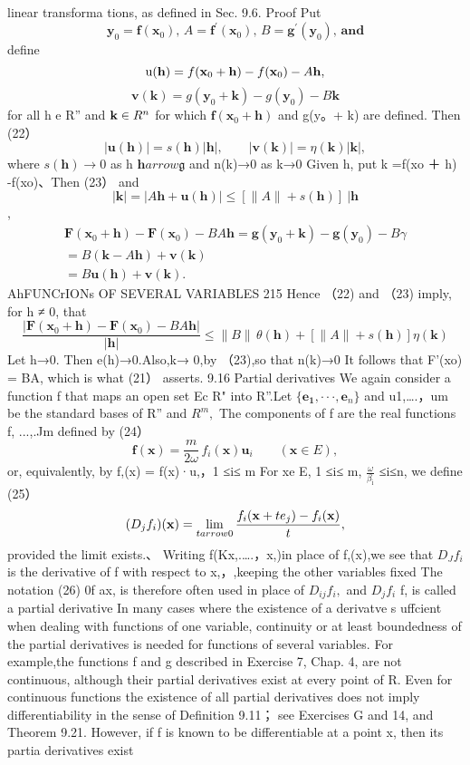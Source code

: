 linear transforma tions, as defined in Sec. 9.6. Proof Put $$ \mathbf{y}_{0}=\mathbf{f}(\mathbf{x}_{0}),\,A={\mathbf{f}}^{\prime}(\mathbf{x}_{0}),\,B=\mathbf{g}^{\prime}(\mathbf{y}_{0}),\,\mathbf{and} $$ define $$ \mathrm{u}({\bf h})=f({\bf x}_{0}+{\bf h})-f({\bf x}_{0})-A{\bf h}, $$ $$ \mathbf{v}(\mathbf{k})=g(\mathbf{y}_{0}+\mathbf{k})-g(\mathbf{y}_{0})-B\mathbf{k} $$ for all h e R” and ${\bf k}\in R^{n}$ for which $\mathbf{f}(\mathbf{x}_{\mathrm{0}}+\mathbf{h})$ and g(y。+ k) are defined. Then (22） $$ \left|\mathbf{u}(\mathbf{h})\right|=s(\mathbf{h})\left|\mathbf{h}\right|,\qquad\left|\mathbf{v}(\mathbf{k})\right|=\eta(\mathbf{k})\left|\mathbf{k}\right|, $$ where $s(\mathbf{h})\to0$ as h ${\mathbf{h}} arrow{\mathfrak{g}}$ and n(k)→0 as k→0 Given h, put k =f(xo ＋ h) -f(xo)、Then (23） and $$ |\mathbf{k}|=|A\mathbf{h}+\mathbf{u}(\mathbf{h})|\leq[\|A\|+s(\mathbf{h})]\mathbf{~}|\mathbf{h} $$ , $$ \begin{array}{r}{\mathbf{F}(\mathbf{x}_{0}+\mathbf{h})-\mathbf{F}(\mathbf{x}_{0})-B A\mathbf{h}=\mathbf{g}(\mathbf{y}_{0}+\mathbf{k})-\mathbf{g}(\mathbf{y}_{0})-B\gamma}\\ {=B(\mathbf{k}-A\mathbf{h})+\mathbf{v}(\mathbf{k})}\\ {=B\mathbf{u}(\mathbf{h})+\mathbf{v}(\mathbf{k}).}\end{array} $$ AhFUNCrIONs OF SEVERAL VARIABLES 215 Hence （22) and （23) imply, for h ≠ 0, that $$ {\frac{|\mathbf{F}(\mathbf{x}_{0}+\mathbf{h})-\mathbf{F}(\mathbf{x}_{0})-B A\mathbf{h}|}{|\mathbf{h}|}}\leq\|B\|\,\theta(\mathbf{h})+[\|A\|+s(\mathbf{h})]\eta(\mathbf{k}) $$ Let h→0. Then e(h)→0.Also,k→ 0,by （23),so that n(k)→0 It follows that F’(xo) = BA, which is what (21） asserts. 9.16 Partial derivatives We again consider a function f that maps an open set Ec R" into R”.Let $\{\mathbf{e_{1}},\cdot\cdot\cdot,\mathbf{e}_{n}\}$ and {u1,….，um} be the standard bases of R” and $R^{m},$ The components of f are the real functions f, ...,.Jm defined by (24） $$ \mathbf{f}(\mathbf{x})={\frac{m}{2\omega}}\,f_{i}(\mathbf{x})\mathbf{u}_{i}\qquad(\mathbf{x}\in E), $$ or, equivalently, by f,(x) = f(x)·u,，1 ≤i≤ m For xe E, 1 ≤i≤ m, $\textstyle{\frac{\omega}{\beta_{\mathrm{i}}}}$ ≤i≤n, we define (25） $$ (D_{j}f_{i})({\bf x})=\operatorname*{lim}_{t arrow0}{\frac{f_{i}({\bf x}+t e_{j})-f_{i}({\bf x})}{t}}, $$ provided the limit exists.、 Writing f(Kx,.….，x,)in place of f,(x),we see that $D_{J}f_{i}$ is the derivative of f with respect to x,，,keeping the other variables fixed The notation (26) 0f ax, is therefore often used in place of $D_{i j}f_{i},$ and $D_{j}f_{i}$ f, is called a partial derivative In many cases where the existence of a derivatve s uffcient when dealing with functions of one variable, continuity or at least boundedness of the partial derivatives is needed for functions of several variables. For example,the functions f and g described in Exercise 7, Chap. 4, are not continuous, although their partial derivatives exist at every point of R. Even for continuous functions the existence of all partial derivatives does not imply differentiability in the sense of Definition 9.11； see Exercises G and 14, and Theorem 9.21. However, if f is known to be differentiable at a point x, then its partia derivatives exist 
